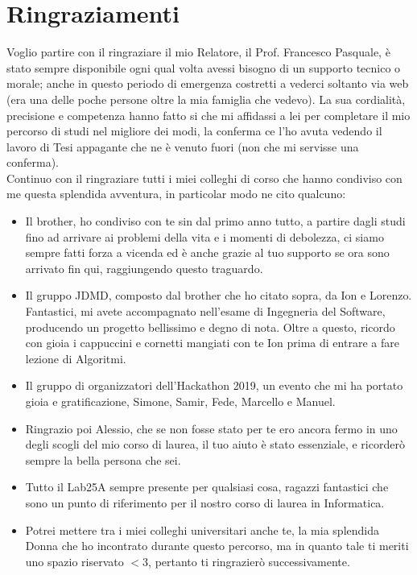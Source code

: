 \chapter*{Ringraziamenti}%
Voglio partire con il ringraziare il mio Relatore, il Prof. Francesco Pasquale, \`e stato sempre disponibile ogni qual volta avessi bisogno di un supporto tecnico o morale; anche in questo periodo di emergenza costretti a vederci soltanto via web (era una delle poche persone oltre la mia famiglia che vedevo). La sua cordialit\`a, precisione e competenza hanno fatto si che mi affidassi a lei per completare il mio percorso di studi nel migliore dei modi, la conferma ce l'ho avuta vedendo il lavoro di Tesi appagante che ne \`e venuto fuori (non che mi servisse una conferma).\\
Continuo con il ringraziare tutti i miei colleghi di corso che hanno condiviso con me questa splendida avventura, in particolar modo ne cito qualcuno:\\

\begin{itemize}
    \item Il brother, ho condiviso con te sin dal primo anno tutto, a partire dagli studi fino ad arrivare ai problemi della vita e i momenti di debolezza, ci siamo sempre fatti forza a vicenda ed \`e anche grazie al tuo supporto se ora sono arrivato fin qui, raggiungendo questo traguardo.
    \item Il gruppo JDMD, composto dal brother che ho citato sopra, da Ion e Lorenzo. Fantastici, mi avete accompagnato nell'esame di Ingegneria del Software, producendo un progetto bellissimo e degno di nota. Oltre a questo, ricordo con gioia i cappuccini e cornetti mangiati con te Ion prima di entrare a fare lezione di Algoritmi.
    \item Il gruppo di organizzatori dell'Hackathon 2019, un evento che mi ha portato gioia e gratificazione, Simone, Samir, Fede, Marcello e Manuel.
    \item Ringrazio poi Alessio, che se non fosse stato per te ero ancora fermo in uno degli scogli del mio corso di laurea, il tuo aiuto \`e stato essenziale, e ricorder\`o sempre la bella persona che sei.
    \item Tutto il Lab25A sempre presente per qualsiasi cosa, ragazzi fantastici che sono un punto di riferimento per il nostro corso di laurea in Informatica.
    \item Potrei mettere tra i miei colleghi universitari anche te, la mia splendida Donna che ho incontrato durante questo percorso, ma in quanto tale ti meriti uno spazio riservato $<$3, pertanto ti ringrazier\`o successivamente.
\end{itemize}

